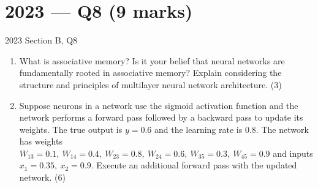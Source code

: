 \documentclass[12pt,a4paper]{article}
\begin{document}
\newpage
\section{2023 --- Q8 (9 marks)}

\begin{qbox}{2023 Section B, Q8}
\begin{enumerate}[label=(\alph*)]
  \item What is associative memory? Is it your belief that neural networks are fundamentally rooted in associative memory? Explain considering the structure and principles of multilayer neural network architecture. (3)
  \item Suppose neurons in a network use the sigmoid activation function and the network performs a forward pass followed by a backward pass to update its weights. The true output is $y=0.6$ and the learning rate is $0.8$. The network has weights $W_{13}=0.1,\ W_{14}=0.4,\ W_{23}=0.8,\ W_{24}=0.6,\ W_{35}=0.3,\ W_{45}=0.9$ and inputs $x_1=0.35,\ x_2=0.9$. Execute an additional forward pass with the updated network. (6)
\end{enumerate}
\end{qbox}
\end{document}
